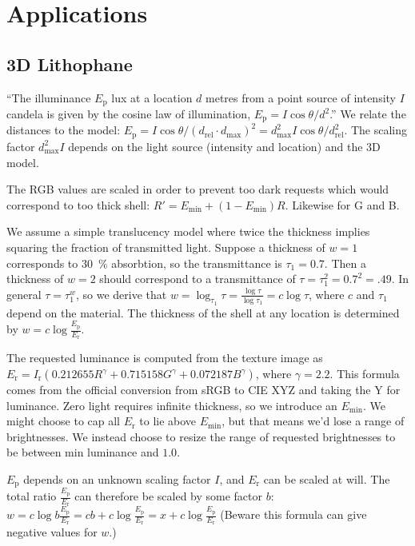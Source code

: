\section{Applications}
\subsection{3D Lithophane}
``The illuminance $E_\text{p}$ lux at a location $d$ metres from a point source of intensity $I$ candela is given by the cosine law of illumination,
$E_\text{p} = I \cos \theta / d^2$.''\cite{snow2001plant}
We relate the distances to the model: $E_\text{p} = I \cos \theta / (d_\text{rel} \cdot d_\text{max})^2 = d_\text{max}^2 I \cos \theta / d_\text{rel}^2$.
The scaling factor $d_\text{max}^2 I$ depends on the light source (intensity and location) and the 3D model.


The RGB values are scaled in order to prevent too dark requests which would correspond to too thick shell: $R' = E_\text{min} +  (1 - E_\text{min}) R$.
Likewise for G and B.

We assume a simple translucency model where twice the thickness implies squaring the fraction of transmitted light.
Suppose a thickness of $w=1$ corresponds to \SI{30}{\percent} absorbtion, so the transmittance is $\tau_1 = 0.7$.
Then a thickness of $w=2$ should correspond to a transmittance of $\tau = \tau_1^2 = 0.7^2 = .49$.
In general $\tau = \tau_1^w$, so we derive that $w = \log_{\tau_1} \tau = \frac{\log \tau}{\log \tau_1} = c \log \tau$,
where $c$ and $\tau_1$ depend on the material.
The thickness of the shell at any location is determined by $w = c \log \frac{E_\text{p}}{E_\text{r}}$.

The requested luminance is computed from the texture image as $E_\text{r} = I_\text{r} \left( 0.212655 R^\gamma + 0.715158 G^\gamma + 0.072187 B ^\gamma \right)$, where $\gamma = 2.2$.
This formula comes from the official conversion from sRGB to CIE XYZ and taking the Y for luminance.
Zero light requires infinite thickness, so we introduce an $E_\text{min}$.
We might choose to cap all $E_\text{r}$ to lie above $E_\text{min}$, but that means we'd lose a range of brightnesses.
We instead choose to resize the range of requested brightnesses to be between min luminance and $1.0$.

$E_\text{p}$ depends on an unknown scaling factor $I$, and $E_\text{r}$ can be scaled at will.
The total ratio $\frac{E_\text{p}}{E_\text{r}}$ can therefore be scaled by some factor $b$:
$w = c \log b \frac{E_\text{p}}{E_\text{r}} = cb + c \log \frac{E_\text{p}}{E_\text{r}} = x + c \log \frac{E_\text{p}}{E_\text{r}}$
(Beware this formula can give negative values for $w$.)

